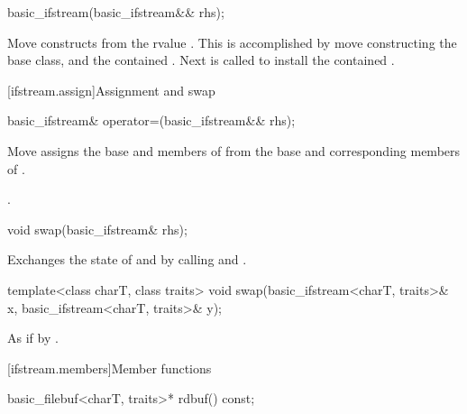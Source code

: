 %
\begin{itemdecl}
basic_ifstream(basic_ifstream&& rhs);
\end{itemdecl}

\begin{itemdescr}
\pnum
\effects Move constructs from the rvalue . This
is accomplished by move constructing the base class, and the contained
. Next
is called to install
the contained .
\end{itemdescr}

[ifstream.assign]{Assignment and swap}

%
\begin{itemdecl}
basic_ifstream& operator=(basic_ifstream&& rhs);
\end{itemdecl}

\begin{itemdescr}
\pnum
\effects Move assigns the base and members of  from the base and corresponding
members of .

\pnum
\returns {}.
\end{itemdescr}

%
\begin{itemdecl}
void swap(basic_ifstream& rhs);
\end{itemdecl}

\begin{itemdescr}
\pnum
\effects Exchanges the state of 
and  by calling
 and
.
\end{itemdescr}

%
\begin{itemdecl}
template<class charT, class traits>
  void swap(basic_ifstream<charT, traits>& x,
            basic_ifstream<charT, traits>& y);
\end{itemdecl}

\begin{itemdescr}
\pnum
\effects As if by .
\end{itemdescr}

[ifstream.members]{Member functions}

%
\begin{itemdecl}
basic_filebuf<charT, traits>* rdbuf() const;
\end{itemdecl}

